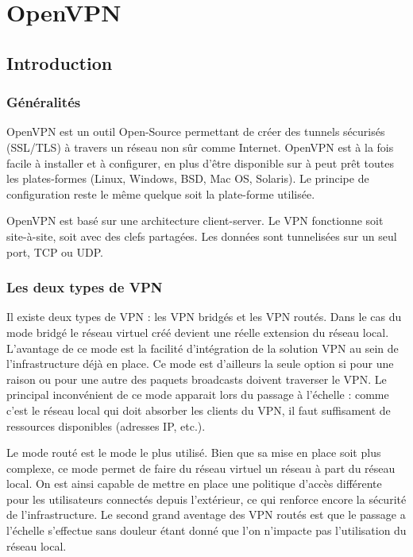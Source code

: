 \section{OpenVPN}

\subsection{Introduction}

\subsubsection{Généralités}
OpenVPN est un outil Open-Source permettant de créer des tunnels sécurisés (SSL/TLS) à travers un réseau non sûr comme Internet. OpenVPN est à la fois facile à installer et à configurer, en plus d'être disponible sur à peut prêt toutes les plates-formes (Linux, Windows, BSD, Mac OS, Solaris). Le principe de configuration reste le même quelque soit la plate-forme utilisée.

OpenVPN est basé sur une architecture client-server. Le VPN fonctionne soit site-à-site, soit avec des clefs partagées. Les données sont tunnelisées sur un seul port, TCP ou UDP.

\subsubsection{Les deux types de VPN}
Il existe deux types de VPN : les VPN bridgés et les VPN routés. Dans le cas du mode bridgé le réseau virtuel créé devient une réelle extension du réseau local. L'avantage de ce mode est la facilité d'intégration de la solution VPN au sein de l'infrastructure déjà en place. Ce mode est d'ailleurs la seule option si pour une raison ou pour une autre des paquets broadcasts doivent traverser le VPN. Le principal inconvénient de ce mode apparait lors du passage à l'échelle : comme c'est le réseau local qui doit absorber les clients du VPN, il faut suffisament de ressources disponibles (adresses IP, etc.).

Le mode routé est le mode le plus utilisé. Bien que sa mise en place soit plus complexe, ce mode permet de faire du réseau virtuel un réseau à part du réseau local. On est ainsi capable de mettre en place une politique d'accès différente pour les utilisateurs connectés depuis l'extérieur, ce qui renforce encore la sécurité de l'infrastructure. Le second grand aventage des VPN routés est que le passage a l'échelle s'effectue sans douleur étant donné que l'on n'impacte pas l'utilisation du réseau local.

